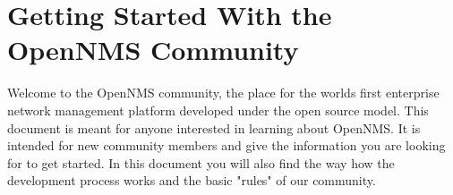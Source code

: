 \section{Getting Started With the OpenNMS Community}
Welcome to the OpenNMS community, the place for the worlds first enterprise network management platform developed under the open source model. This document is meant for anyone interested in learning about OpenNMS. It is intended for new community members and give the information you are looking for to get started. In this document you will also find the way how the development process works and the basic "rules" of our community.
